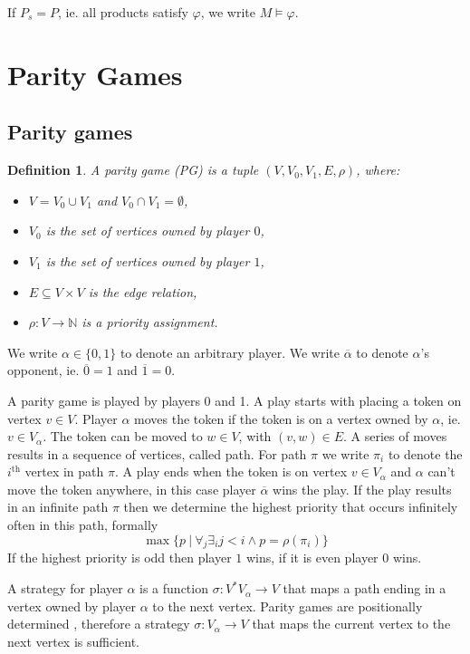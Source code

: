 \documentclass[]{article}
\newtheorem{definition}{Definition}[section]
\begin{document}
If $P_s = P$, ie. all products satisfy $\varphi$, we write $M \models \varphi$.

\section{Parity Games}
\subsection{Parity games}
\begin{definition}
	\label{def_PG}\cite{Bradfield2018}
	A parity game (PG) is a tuple $(V, V_0, V_1, E, \rho)$, where:
	\begin{itemize}
		\item $V = V_0 \cup V_1$ and $V_0 \cap V_1 = \emptyset$,
		\item $V_0$ is the set of vertices owned by player $0$,
		\item $V_1$ is the set of vertices owned by player $1$, 
		\item $E \subseteq V \times V$ is the edge relation,
		\item $\rho :  V \rightarrow \mathbb{N}$ is a priority assignment.
	\end{itemize}
\end{definition}
We write $\alpha \in \{0,1\}$ to denote an arbitrary player. We write $\overline{\alpha}$ to denote $\alpha$'s opponent, ie. $\overline{0} = 1$ and $\overline{1} = 0$.

A parity game is played by players 0 and 1. A play starts with placing a token on vertex $v \in V$. Player $\alpha$ moves the token if the token is on a vertex owned by $\alpha$, ie. $v \in V_\alpha$. The token can be moved to $w \in V$, with $(v,w) \in E$. A series of moves results in a sequence of vertices, called path. For path $\pi$ we write $\pi_i$ to denote the $i^{\text{th}}$ vertex in path $\pi$. A play ends when the token is on vertex $v \in V_\alpha$ and $\alpha$ can't move the token anywhere, in this case player $\overline{\alpha}$ wins the play. If the play results in an infinite path $\pi$ then we determine the highest priority that occurs infinitely often in this path, formally
\[ \max\{ p \ |\ \forall_j \exists_i j < i \wedge p = \rho(\pi_i) \}\] 
If the highest priority is odd then player $1$ wins, if it is even player $0$ wins.

A strategy for player $\alpha$ is a function $\sigma : V^*V_\alpha \rightarrow V$ that maps a path ending in a vertex owned by player $\alpha$ to the next vertex. Parity games are positionally determined \cite{Bradfield2018}, therefore a strategy $\sigma: V_\alpha \rightarrow V$ that maps the current vertex to the next vertex is sufficient. 
\end{document}
